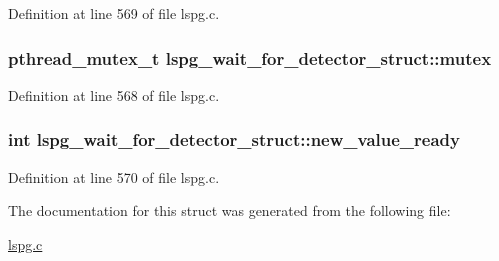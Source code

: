 Definition at line 569 of file lspg.\-c.

\hypertarget{structlspg__wait__for__detector__struct_a958e9fe59e671e61f95c2ce796ba24ce}{
\subsubsection[{mutex}]{\setlength{\rightskip}{0pt plus 5cm}pthread\-\_\-mutex\-\_\-t lspg\-\_\-wait\-\_\-for\-\_\-detector\-\_\-struct\-::mutex}}\label{structlspg__wait__for__detector__struct_a958e9fe59e671e61f95c2ce796ba24ce}


Definition at line 568 of file lspg.\-c.

\hypertarget{structlspg__wait__for__detector__struct_ad950e85c70c4473c5c7c40f8ceeae61d}{
\subsubsection[{new\-\_\-value\-\_\-ready}]{\setlength{\rightskip}{0pt plus 5cm}int lspg\-\_\-wait\-\_\-for\-\_\-detector\-\_\-struct\-::new\-\_\-value\-\_\-ready}}\label{structlspg__wait__for__detector__struct_ad950e85c70c4473c5c7c40f8ceeae61d}


Definition at line 570 of file lspg.\-c.



The documentation for this struct was generated from the following file\-:\begin{DoxyCompactItemize}
\item 
\hyperlink{lspg_8c}{lspg.\-c}\end{DoxyCompactItemize}
